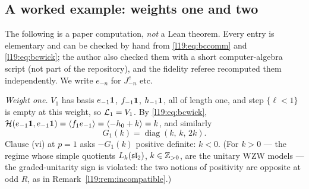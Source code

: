 \subsection{A worked example: weights one and two}

\begin{example}\label{l19:ex:bcweight2}
The following is a paper computation, \emph{not} a Lean theorem. Every entry is elementary and can be checked by hand
from \eqref{l19:eq:bccomm} and \eqref{l19:eq:bcwick}; the author also checked them with a short computer-algebra script
(not part of the repository), and the fidelity referee recomputed them independently. We write $e_{-n}$ for
$J^e_{-n}$ etc.

\emph{Weight one.} $V_1$ has basis $e_{-1}\mathbf{1}$, $f_{-1}\mathbf{1}$, $h_{-1}\mathbf{1}$, all of length one, and
step $\{\ell<1\}$ is empty at this weight, so $\mathcal{L}_1 = V_1$. By \eqref{l19:eq:bcwick},
$\mathcal H(e_{-1}\mathbf{1},e_{-1}\mathbf{1}) = \langle f_1e_{-1}\rangle = \langle -h_0+k\rangle = k$, and similarly
\begin{equation*}
  G_1(k) = \operatorname{diag}(k,\,k,\,2k).
\end{equation*}
Clause (vi) at $p = 1$ asks $-G_1(k)$ positive definite: $k<0$. (For $k>0$ --- the regime whose simple quotients
$L_k(\mathfrak{sl}_2)$, $k\in{\mathbb{Z}}_{>0}$, are the unitary WZW models --- the graded-unitarity sign is violated: the two notions of positivity are opposite at odd $R$, as in
Remark~\ref{l19:rem:incompatible}.)


\end{example}
